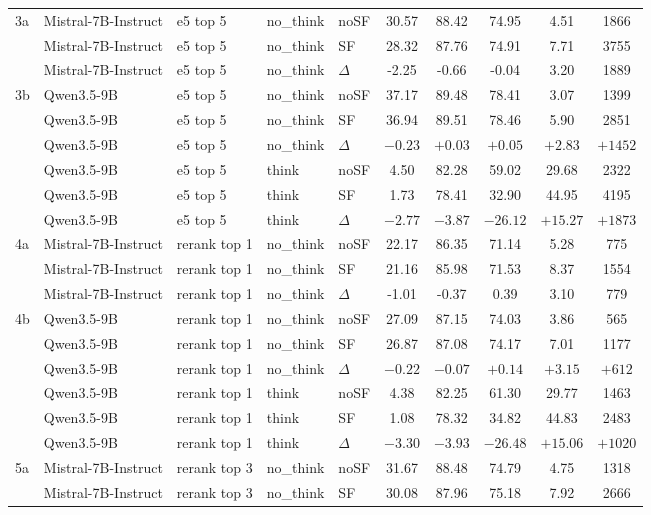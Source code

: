 \begin{scriptsize}
\begin{longtable}{l l l l l c c c c c}
\dmidrule
3a & Mistral-7B-Instruct & e5 top 5 & no\_think & noSF & 30.57 & 88.42 & 74.95 & 4.51 & 1866 \\
 & Mistral-7B-Instruct & e5 top 5 & no\_think & SF & 28.32 & 87.76 & 74.91 & 7.71 & 3755 \\
 & Mistral-7B-Instruct & e5 top 5 & no\_think & $\Delta$ & -2.25 & -0.66 & -0.04 & 3.20 & 1889 \\
3b & Qwen3.5-9B & e5 top 5 & no\_think & noSF & 37.17 & 89.48 & 78.41 & 3.07 & 1399 \\
 & Qwen3.5-9B & e5 top 5 & no\_think & SF & 36.94 & 89.51 & 78.46 & 5.90 & 2851 \\
 & Qwen3.5-9B & e5 top 5 & no\_think & $\Delta$ & $-0.23$ & $+0.03$ & $+0.05$ & $+2.83$ & $+1452$ \\
 & Qwen3.5-9B & e5 top 5 & think & noSF & 4.50 & 82.28 & 59.02 & 29.68 & 2322 \\
 & Qwen3.5-9B & e5 top 5 & think & SF & 1.73 & 78.41 & 32.90 & 44.95 & 4195 \\
 & Qwen3.5-9B & e5 top 5 & think & $\Delta$ & $-2.77$ & $-3.87$ & $-26.12$ & $+15.27$ & $+1873$ \\
\dmidrule
4a & Mistral-7B-Instruct & rerank top 1 & no\_think & noSF & 22.17 & 86.35 & 71.14 & 5.28 & 775 \\
 & Mistral-7B-Instruct & rerank top 1 & no\_think & SF & 21.16 & 85.98 & 71.53 & 8.37 & 1554 \\
 & Mistral-7B-Instruct & rerank top 1 & no\_think & $\Delta$ & -1.01 & -0.37 & 0.39 & 3.10 & 779 \\
4b & Qwen3.5-9B & rerank top 1 & no\_think & noSF & 27.09 & 87.15 & 74.03 & 3.86 & 565 \\
 & Qwen3.5-9B & rerank top 1 & no\_think & SF & 26.87 & 87.08 & 74.17 & 7.01 & 1177 \\
 & Qwen3.5-9B & rerank top 1 & no\_think & $\Delta$ & $-0.22$ & $-0.07$ & $+0.14$ & $+3.15$ & $+612$ \\
 & Qwen3.5-9B & rerank top 1 & think & noSF & 4.38 & 82.25 & 61.30 & 29.77 & 1463 \\
 & Qwen3.5-9B & rerank top 1 & think & SF & 1.08 & 78.32 & 34.82 & 44.83 & 2483 \\
 & Qwen3.5-9B & rerank top 1 & think & $\Delta$ & $-3.30$ & $-3.93$ & $-26.48$ & $+15.06$ & $+1020$ \\
\dmidrule
5a & Mistral-7B-Instruct & rerank top 3 & no\_think & noSF & 31.67 & 88.48 & 74.79 & 4.75 & 1318 \\
 & Mistral-7B-Instruct & rerank top 3 & no\_think & SF & 30.08 & 87.96 & 75.18 & 7.92 & 2666 \\

\end{longtable}
\end{scriptsize}
